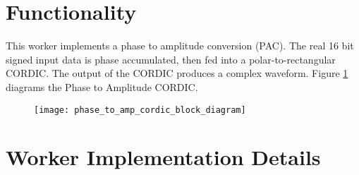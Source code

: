 \def\name{\comp}
\def\workertype{Application}
\def\version{\ocpiversion}
\def\releasedate{11/2019}
\def\componentlibrary{ocpi.assets.dsp\_{}comps}
\def\workers{\comp{}.hdl, \comp{}.rcc}
\def\testedplatforms{alst4, CentOS7, E310(PL), isim, Matchstiq-Z1(PL), ml605, modelsim, xilinx13\_{}3, xsim, ZedBoard(PL)}


\section*{Functionality}
\begin{flushleft}
	This worker implements a phase to amplitude conversion (PAC). The real 16 bit signed input data is phase accumulated, then fed into a polar-to-rectangular CORDIC. The output of the CORDIC produces a complex waveform. Figure \ref{fig:phase_to_amp_cordic} diagrams the Phase to Amplitude CORDIC.

	\begin{figure}[h]
		\centering\captionsetup{type=figure}\texttt{[image: phase\_to\_amp\_cordic\_block\_diagram]}
		\label{fig:phase_to_amp_cordic}
	\end{figure}
\end{flushleft}

\section*{Worker Implementation Details}
